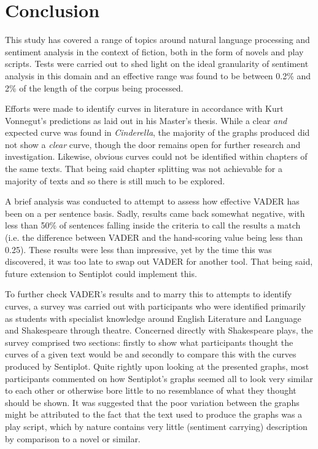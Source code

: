 \documentclass{article}
\begin{document}
{\section{Conclusion}
    This study has covered a range of topics around natural language processing and sentiment analysis in the context of fiction, both in the form of novels and play scripts. Tests were carried out to shed light on the ideal granularity of sentiment analysis in this domain and an effective range was found to be between 0.2\% and 2\% of the length of the corpus being processed.
    
    Efforts were made to identify curves in literature in accordance with Kurt Vonnegut's predictions as laid out in his Master's thesis. While a clear \textit{and} expected curve was found in \textit{Cinderella}, the majority of the graphs produced did not show a \textit{clear} curve, though the door remains open for further research and investigation. Likewise, obvious curves could not be identified within chapters of the same texts. That being said chapter splitting was not achievable for a majority of texts and so there is still much to be explored.
    
    A brief analysis was conducted to attempt to assess how effective VADER has been on a per sentence basis. Sadly, results came back somewhat negative, with less than 50\% of sentences falling inside the criteria to call the results a match (i.e. the difference between VADER and the hand-scoring value being less than 0.25). These results were less than impressive, yet by the time this was discovered, it was too late to swap out VADER for another tool. That being said, future extension to Sentiplot could implement this.
    
    To further check VADER's results and to marry this to attempts to identify curves, a survey was carried out with participants who were identified primarily as students with specialist knowledge around English Literature and Language and Shakespeare through theatre. Concerned directly with Shakespeare plays, the survey comprised two sections: firstly to show what participants thought the curves of a given text would be and secondly to compare this with the curves produced by Sentiplot. Quite rightly upon looking at the presented graphs, most participants commented on how Sentiplot's graphs seemed all to look very similar to each other or otherwise bore little to no resemblance of what they thought should be shown. It was suggested that the poor variation between the graphs might be attributed to the fact that the text used to produce the graphs was a play script, which by nature contains very little (sentiment carrying) description by comparison to a novel or similar.

}
\end{document}

